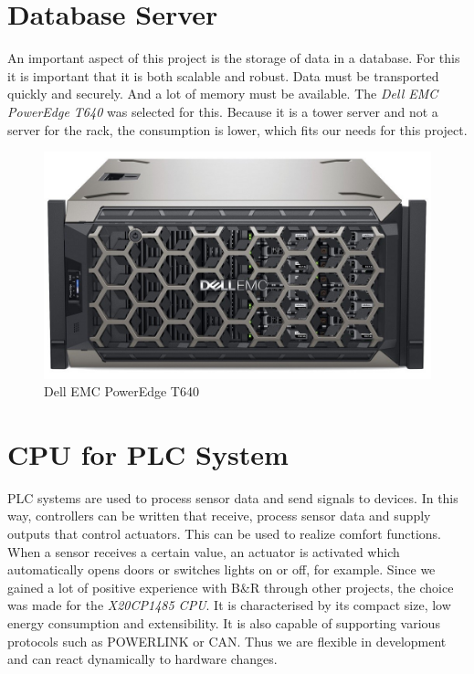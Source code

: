 \section{Database Server}
An important aspect of this project is the storage of data in a database. For this it is important that it is both scalable and robust. Data must be transported quickly and securely. And a lot of memory must be available. The \textit{Dell EMC PowerEdge T640} was selected for this. Because it is a tower server and not a server for the rack, the consumption is lower, which fits our needs for this project.

\begin{figure}[h]
	\centering
	\includegraphics[width=.6\textwidth]{images/CostAnalysis/DellEMCPowerEdgeT640} 
	\caption{Dell EMC PowerEdge T640}
	\label{fig:dbServer}
\end{figure}

\section{CPU for PLC System}
PLC systems are used to process sensor data and send signals to devices. In this way, controllers can be written that receive, process sensor data and supply outputs that control actuators. This can be used to realize comfort functions. When a sensor receives a certain value, an actuator is activated which automatically opens doors or switches lights on or off, for example. Since we gained a lot of positive experience with B\&R through other projects, the choice was made for the \textit{X20CP1485 CPU}. It is characterised by its compact size, low energy consumption and extensibility. It is also capable of supporting various protocols such as POWERLINK or CAN. Thus we are flexible in development and can react dynamically to hardware changes.

